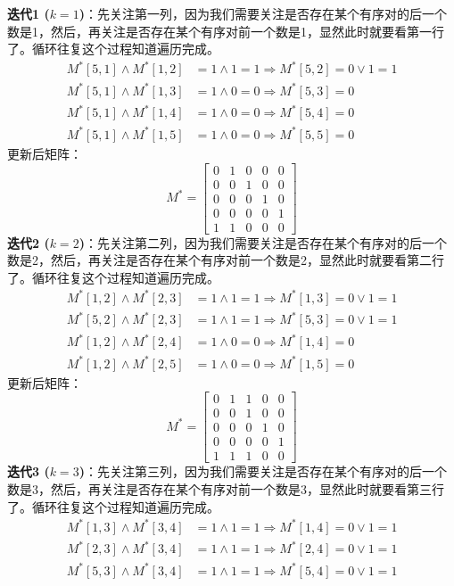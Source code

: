 \textbf{迭代1 ($k=1$)}：先关注第一列，因为我们需要关注是否存在某个有序对的后一个数是1，然后，再关注是否存在某个有序对前一个数是1，显然此时就要看第一行了。循环往复这个过程知道遍历完成。
\begin{align*}
M^*[5,1] \land M^*[1,2] &= 1 \land 1 = 1 \Rightarrow M^*[5,2] = 0 \lor 1 = 1 \\
M^*[5,1] \land M^*[1,3] &= 1 \land 0 = 0 \Rightarrow M^*[5,3] = 0 \\
M^*[5,1] \land M^*[1,4] &= 1 \land 0 = 0 \Rightarrow M^*[5,4] = 0 \\
M^*[5,1] \land M^*[1,5] &= 1 \land 0 = 0 \Rightarrow M^*[5,5] = 0
\end{align*}
更新后矩阵：
\[
M^* = \begin{bmatrix}
0 & 1 & 0 & 0 & 0 \\
0 & 0 & 1 & 0 & 0 \\
0 & 0 & 0 & 1 & 0 \\
0 & 0 & 0 & 0 & 1 \\
1 & 1 & 0 & 0 & 0
\end{bmatrix}
\]
\textbf{迭代2 ($k=2$)}：先关注第二列，因为我们需要关注是否存在某个有序对的后一个数是2，然后，再关注是否存在某个有序对前一个数是2，显然此时就要看第二行了。循环往复这个过程知道遍历完成。
\begin{align*}
M^*[1,2] \land M^*[2,3] &= 1 \land 1 = 1 \Rightarrow M^*[1,3] = 0 \lor 1 = 1 \\
M^*[5,2] \land M^*[2,3] &= 1 \land 1 = 1 \Rightarrow M^*[5,3] = 0 \lor 1 = 1 \\
M^*[1,2] \land M^*[2,4] &= 1 \land 0 = 0 \Rightarrow M^*[1,4] = 0 \\
M^*[1,2] \land M^*[2,5] &= 1 \land 0 = 0 \Rightarrow M^*[1,5] = 0
\end{align*}
更新后矩阵：
\[
M^* = \begin{bmatrix}
0 & 1 & 1 & 0 & 0 \\
0 & 0 & 1 & 0 & 0 \\
0 & 0 & 0 & 1 & 0 \\
0 & 0 & 0 & 0 & 1 \\
1 & 1 & 1 & 0 & 0
\end{bmatrix}
\]
\textbf{迭代3 ($k=3$)}：先关注第三列，因为我们需要关注是否存在某个有序对的后一个数是3，然后，再关注是否存在某个有序对前一个数是3，显然此时就要看第三行了。循环往复这个过程知道遍历完成。
\begin{align*}
M^*[1,3] \land M^*[3,4] &= 1 \land 1 = 1 \Rightarrow M^*[1,4] = 0 \lor 1 = 1 \\
M^*[2,3] \land M^*[3,4] &= 1 \land 1 = 1 \Rightarrow M^*[2,4] = 0 \lor 1 = 1 \\
M^*[5,3] \land M^*[3,4] &= 1 \land 1 = 1 \Rightarrow M^*[5,4] = 0 \lor 1 = 1
\end{align*}
